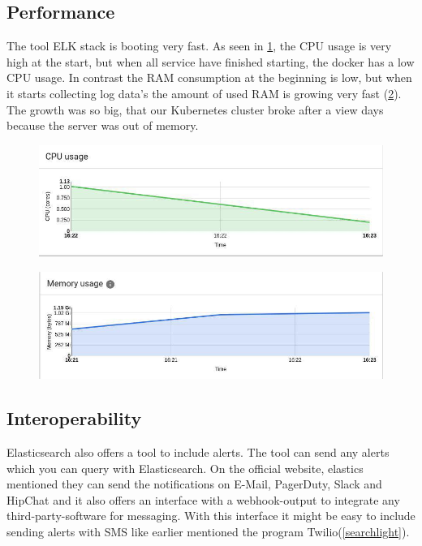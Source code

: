\subsection{Performance}
The tool ELK stack is booting very fast. As seen in \cref{fig:ELK_CPU}, the CPU usage is very high at the start, but when all service have finished starting, the docker has a low CPU usage. In contrast the RAM consumption at the beginning is low, but when it starts collecting log data's the amount of used RAM is growing very fast (\cref{fig:ELK_MEM}). The growth was so big, that our Kubernetes cluster broke after a view days because the server was out of memory.
\begin{figure}
	\centering
	\includegraphics[width=1\linewidth]{Bilder/Performance/ELK_CPU}
	\caption{}
	\label{fig:ELK_CPU}
\end{figure}
\begin{figure}
	\centering
	\includegraphics[width=1\linewidth]{Bilder/Performance/ELK_MEM}
	\caption{}
	\label{fig:ELK_MEM}
\end{figure}
\subsection{Interoperability}
Elasticsearch also offers a tool to include alerts. The tool can send any alerts which you can query with Elasticsearch. On the official website, elastics mentioned they can send the notifications on E-Mail, PagerDuty, Slack and HipChat and it also offers an interface with a webhook-output to integrate any third-party-software for messaging. With this interface it might be easy to include sending alerts with SMS like earlier mentioned the program Twilio(\ref{searchlight}).
